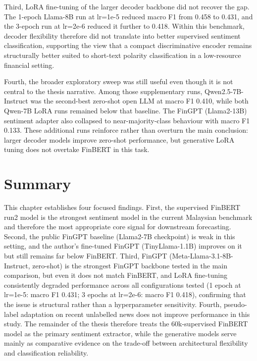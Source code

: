 \documentclass[12pt]{ucetd}
\begin{document}
Third, LoRA fine-tuning of the larger decoder backbone did not recover the gap. The 1-epoch Llama-8B run at lr=1e-5 reduced macro F1 from 0.458 to 0.431, and the 3-epoch run at lr=2e-6 reduced it further to 0.418. Within this benchmark, decoder flexibility therefore did not translate into better supervised sentiment classification, supporting the view that a compact discriminative encoder remains structurally better suited to short-text polarity classification in a low-resource financial setting.

Fourth, the broader exploratory sweep was still useful even though it is not central to the thesis narrative. Among those supplementary runs, Qwen2.5-7B-Instruct was the second-best zero-shot open LLM at macro F1 0.410, while both Qwen-7B LoRA runs remained below that baseline. The FinGPT (Llama2-13B) sentiment adapter also collapsed to near-majority-class behaviour with macro F1 0.133. These additional runs reinforce rather than overturn the main conclusion: larger decoder models improve zero-shot performance, but generative LoRA tuning does not overtake FinBERT in this task.

\section{Summary}
This chapter establishes four focused findings. First, the supervised FinBERT run2 model is the strongest sentiment model in the current Malaysian benchmark and therefore the most appropriate core signal for downstream forecasting. Second, the public FinGPT baseline (Llama2-7B checkpoint) is weak in this setting, and the author's fine-tuned FinGPT (TinyLlama-1.1B) improves on it but still remains far below FinBERT. Third, FinGPT (Meta-Llama-3.1-8B-Instruct, zero-shot) is the strongest FinGPT backbone tested in the main comparison, but even it does not match FinBERT, and LoRA fine-tuning consistently degraded performance across all configurations tested (1 epoch at lr=1e-5: macro F1 0.431; 3 epochs at lr=2e-6: macro F1 0.418), confirming that the issue is structural rather than a hyperparameter sensitivity. Fourth, pseudo-label adaptation on recent unlabelled news does not improve performance in this study. The remainder of the thesis therefore treats the 60k-supervised FinBERT model as the primary sentiment extractor, while the generative models serve mainly as comparative evidence on the trade-off between architectural flexibility and classification reliability.
\end{document}
